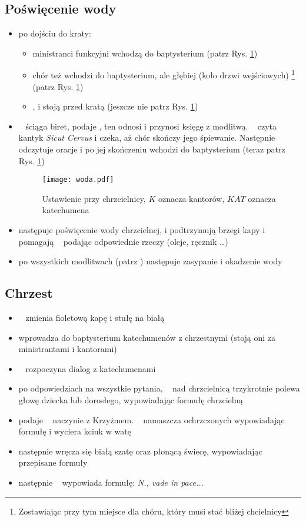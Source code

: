 \subsection{Poświęcenie wody}
\begin{itemize}
	\item po dojściu do kraty:
	      \begin{itemize}
		      \item ministranci funkcyjni wchodzą do baptysterium (patrz Rys.
		            \ref{fig:woda})
		      \item chór też wchodzi do baptysterium, ale głębiej (koło drzwi
		            wejściowych) \footnote{Zostawiając przy tym miejsce dla
			            chóru, który musi stać bliżej chcielnicy} (patrz Rys.
		            \ref{fig:woda})
		      \item \ii,  i  stoją przed kratą (jeszcze nie patrz Rys.
		            \ref{fig:woda})
	      \end{itemize}
	\item \ii~ ściąga biret, podaje , ten odnosi i przynosi księgę z
	      modlitwą. \ii~ czyta kantyk \textit{Sicut Cervus} i czeka, aż chór
	      skończy jego śpiewanie. Następnie odczytuje oracje  i po jej skończeniu wchodzi do baptysterium (teraz patrz Rys.
	      \ref{fig:woda})
	      \begin{figure}[h!]
		      \centering
		      \texttt{[image: woda.pdf]}
		      \caption{Ustawienie przy chrzcielnicy, $K$ oznacza kantorów, $KAT$
			      oznacza katechumena}
		      \label{fig:woda}
	      \end{figure}
	\item następuje poświęcenie wody chrzcielnej,  i  podtrzymują brzegi
	      kapy i pomagają \ii~ podając odpowiednie rzeczy (oleje, ręcznik \dots)
	\item po wszystkich modlitwach (patrz \textit{}) następuje
	      zasypanie i okadzenie wody
\end{itemize}
\subsection{Chrzest}
\begin{itemize}
	\item \ii~ zmienia {\color{violet} fioletową} kapę i stułę na białą
	\item {} wprowadza do baptysterium katechumenów z chrzestnymi (stoją oni
	      za ministrantami i kantorami)
	\item \ii~ rozpoczyna dialog z katechumenami
	\item po odpowiedziach na wszystkie pytania, \ii~ nad chrzcielnicą
	      trzykrotnie polewa głowę dziecka lub dorosłego, wypowiadając formułę
	      chrzcielną
	\item {} podaje \ii~ naczynie z Krzyżmem. \ii~ namaszcza ochrzczonych
	      wypowiadając formułę i wyciera kciuk w watę
	\item następnie wręcza się białą szatę oraz płonącą świecę, wypowiadając
	      przepisane formuły
	\item następnie \ii~ wypowiada formułę: \textit{N., vade in pace...}
\end{itemize}
